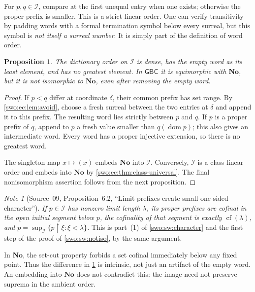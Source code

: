 \documentclass[11pt]{article}
\newtheorem{proposition}[proposition]{Proposition}
\theoremstyle{definition}
\theoremstyle{remark}
\newtheorem{note}[note]{Note}
\newcommand{\No}{\mathbf{No}}
\newcommand{\Words}{\mathcal I}
\newcommand{\dom}{\operatorname{dom}}
\newcommand{\cf}{\operatorname{cf}}
\newcommand{\restr}{\mathbin{\upharpoonright}}
\newcommand{\GBC}{\mathsf{GBC}}
\begin{document}
For $p,q\in\Words$, compare at the first unequal entry when one exists;
otherwise the proper prefix is smaller. This is a strict linear order.
One can verify transitivity by padding words with a formal termination
symbol below every surreal, but this symbol is \emph{not itself a
surreal number}. It is simply part of the definition of word order.

\begin{proposition}\label{swo:ec:prop:words}
The dictionary order on $\Words$ is dense, has the empty word as its
least element, and has no greatest element. In $\GBC$ it is equimorphic
with $\No$, but it is not isomorphic to $\No$, even after removing the
empty word.
\end{proposition}
\begin{proof}
If $p<q$ differ at coordinate $\delta$, their common prefix has set
range. By \cref{swo:ec:lem:avoid}, choose a fresh surreal between the two
entries at $\delta$ and append it to this prefix. The resulting word
lies strictly between $p$ and $q$. If $p$ is a proper prefix of $q$,
append to $p$ a fresh value smaller than $q(\dom p)$; this also gives an
intermediate word. Every word has a proper injective extension, so there
is no greatest word.

The singleton map $x\mapsto(x)$ embeds $\No$ into $\Words$. Conversely,
$\Words$ is a class linear order and embeds into $\No$ by
\cref{swo:ec:thm:class-universal}. The final nonisomorphism assertion follows
from the next proposition.
\end{proof}


\begin{note}[Source~09, Proposition~6.2, ``Limit prefixes create small one-sided character'']\label{swo:ec:prop:prefix-cf}
\emph{If $p\in\Words$ has nonzero limit length $\lambda$, its proper prefixes
are cofinal in the open initial segment below $p$, the cofinality of that
segment is exactly $\cf(\lambda)$, and
$p=\sup_{\Words}\{p\restr\xi:\xi<\lambda\}$.} This is part~(1) of
\cref{swo:sw:character} and the first step of the proof of \cref{swo:sw:notiso},
by the same argument.
\end{note}

In $\No$, the set-cut property forbids a set cofinal immediately below
any fixed point. Thus the difference in \cref{swo:ec:prop:prefix-cf} is intrinsic,
not just an artifact of the empty word. An embedding into $\No$ does not
contradict this: the image need not preserve suprema in the ambient order.
\end{document}
